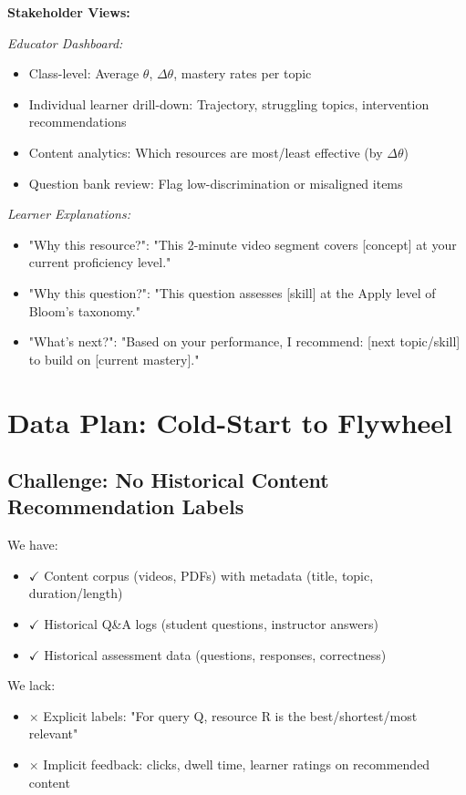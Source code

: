 \documentclass[11pt,letterpaper]{article}
\begin{document}
\textbf{Stakeholder Views:}

\textit{Educator Dashboard:}
\begin{itemize}
\item Class-level: Average $\theta$, $\Delta\theta$, mastery rates per topic
\item Individual learner drill-down: Trajectory, struggling topics, intervention recommendations
\item Content analytics: Which resources are most/least effective (by $\Delta\theta$)
\item Question bank review: Flag low-discrimination or misaligned items
\end{itemize}

\textit{Learner Explanations:}
\begin{itemize}
\item "Why this resource?": "This 2-minute video segment covers [concept] at your current proficiency level."
\item "Why this question?": "This question assesses [skill] at the Apply level of Bloom's taxonomy."
\item "What's next?": "Based on your performance, I recommend: [next topic/skill] to build on [current mastery]."
\end{itemize}

\newpage

\section{Data Plan: Cold-Start to Flywheel}

\subsection{Challenge: No Historical Content Recommendation Labels}

We have:
\begin{itemize}
\item $\checkmark$ Content corpus (videos, PDFs) with metadata (title, topic, duration/length)
\item $\checkmark$ Historical Q\&A logs (student questions, instructor answers)
\item $\checkmark$ Historical assessment data (questions, responses, correctness)
\end{itemize}

We lack:
\begin{itemize}
\item $\times$ Explicit labels: "For query Q, resource R is the best/shortest/most relevant"
\item $\times$ Implicit feedback: clicks, dwell time, learner ratings on recommended content
\end{itemize}
\end{document}
